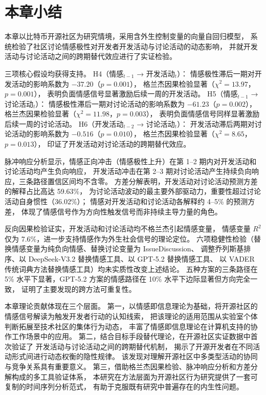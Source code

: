 \section{本章小结}

本章以比特币开源社区为研究情境，采用含外生控制变量的向量自回归模型，
系统检验了社区讨论情感极性对开发者开发活动与讨论活动的动态影响，
并就开发活动与讨论活动之间的跨期替代效应进行了实证检验。

三项核心假设均获得支持。
H4（情感$_{t-1}$ → 开发活动$_t$）：
情感极性滞后一期对开发活动的影响系数为 $-37.20$（$p = 0.001$），
格兰杰因果检验显著（$\chi^2 = 13.97$，$p = 0.001$），
表明负面情感信号显著激励后续一周的开发活动。
H5（情感$_{t-1}$ → 讨论活动$_t$）：
情感极性滞后一期对讨论活动的影响系数为 $-61.23$（$p = 0.002$），
格兰杰因果检验显著（$\chi^2 = 11.98$，$p = 0.003$），
表明负面情感信号同样显著激励后续一周的讨论活动。
H6（开发活动$_{t-2}$ → 讨论活动$_t$）：
开发活动滞后两期对讨论活动的影响系数为 $-0.516$（$p = 0.010$），
格兰杰因果检验显著（$\chi^2 = 8.65$，$p = 0.013$），
印证了开发活动对讨论活动的跨期替代效应。

脉冲响应分析显示，情感正向冲击（情感极性上升）在第 1--2 期内对开发活动和讨论活动均产生负向响应，
开发活动冲击在第 2--3 期对讨论活动产生持续负向响应，三条路径置信区间均不含零。
方差分解表明，开发活动对讨论活动预测方差的解释占比高达 59.63\%，
为讨论活动波动的最主要外部驱动力，重要性超过讨论活动自身惯性（36.02\%）；
情感对开发活动和讨论活动各解释约 4--5\% 的预测方差，
体现了情感信号作为方向性触发信号而非持续主导力量的角色。

反向因果检验证实，开发活动和讨论活动均不格兰杰引起情感变量，
情感变量 $R^2$ 仅为 7.6\%，进一步支持情感作为外生社会信号的理论定位。
六项稳健性检验（替换情感变量为纯负向情感、替换讨论变量为 IssueDiscussion、
调整乔列斯基排序、以 DeepSeek-V3.2 替换情感工具、以 GPT-5.2 替换情感工具、
以 VADER 传统词典方法替换情感工具）均未实质性改变上述结论。
五种方案的三条路径在 5\% 水平下显著，GPT-5.2 方案的情感路径在 10\% 水平下边际显著但方向完全一致，
证明了主要发现的跨方法可重复性。

本章理论贡献体现在三个层面。
第一，以情感即信息理论为基础，将开源社区的情感信号解读为触发开发者行动的认知线索，
把该理论的适用范围从实验室个体判断拓展至技术社区的集体行为动态，
丰富了情感即信息理论在计算机支持的协作工作场景中的应用。
第二，结合目标手段替代理论，在开源社区实证数据中首次验证了
开发活动与讨论活动之间的跨期替代机制，
揭示了开源开发者在不同活动形式间进行动态权衡的隐性规律。
该发现对理解开源社区中多类型活动的协同与竞争关系具有重要意义。
第三，借助格兰杰因果检验、脉冲响应分析和方差分解构成的多工具验证体系，
本研究在方法层面为开源社区行为研究提供了一套可复制的时间序列分析范式，
有助于克服既有研究中普遍存在的内生性问题。

